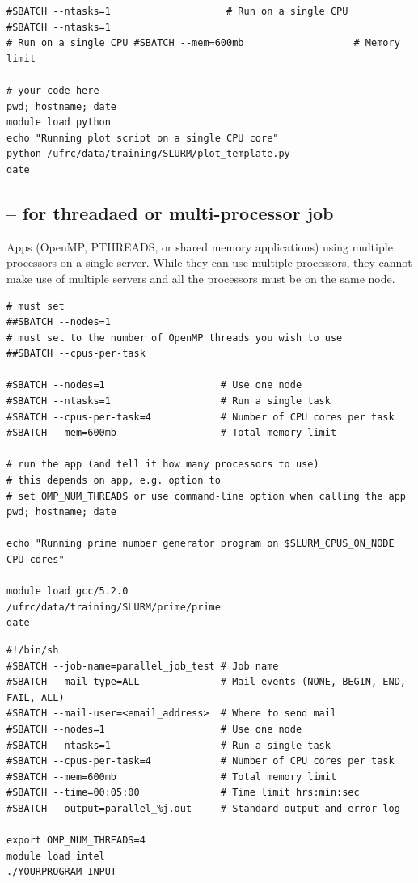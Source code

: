 \begin{verbatim}
#SBATCH --ntasks=1                    # Run on a single CPU
#SBATCH --ntasks=1   
# Run on a single CPU #SBATCH --mem=600mb                   # Memory limit

# your code here
pwd; hostname; date
module load python
echo "Running plot script on a single CPU core"
python /ufrc/data/training/SLURM/plot_template.py
date
\end{verbatim}

\subsection{-- for threadaed or multi-processor job}

Apps (OpenMP, PTHREADS, or shared memory applications) using multiple processors
on a single server. While they can use multiple processors, they cannot make use
of multiple servers and all the processors must be on the same node.

\begin{verbatim}
# must set
##SBATCH --nodes=1
# must set to the number of OpenMP threads you wish to use
##SBATCH --cpus-per-task

#SBATCH --nodes=1                    # Use one node
#SBATCH --ntasks=1                   # Run a single task	
#SBATCH --cpus-per-task=4            # Number of CPU cores per task
#SBATCH --mem=600mb                  # Total memory limit

# run the app (and tell it how many processors to use)
# this depends on app, e.g. option to
# set OMP_NUM_THREADS or use command-line option when calling the app
pwd; hostname; date
 
echo "Running prime number generator program on $SLURM_CPUS_ON_NODE CPU cores"
 
module load gcc/5.2.0 
/ufrc/data/training/SLURM/prime/prime
date
\end{verbatim}

\begin{verbatim}
#!/bin/sh
#SBATCH --job-name=parallel_job_test # Job name
#SBATCH --mail-type=ALL              # Mail events (NONE, BEGIN, END, FAIL, ALL)
#SBATCH --mail-user=<email_address>  # Where to send mail	
#SBATCH --nodes=1                    # Use one node
#SBATCH --ntasks=1                   # Run a single task	
#SBATCH --cpus-per-task=4            # Number of CPU cores per task
#SBATCH --mem=600mb                  # Total memory limit
#SBATCH --time=00:05:00              # Time limit hrs:min:sec
#SBATCH --output=parallel_%j.out     # Standard output and error log
 
export OMP_NUM_THREADS=4
module load intel
./YOURPROGRAM INPUT
\end{verbatim}

